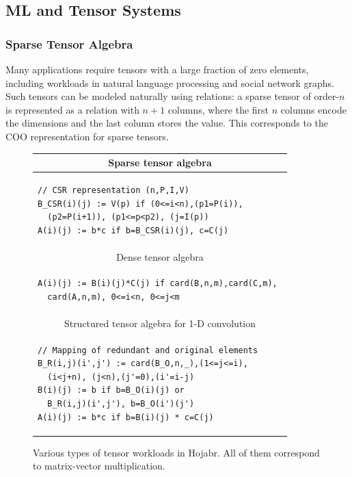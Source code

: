 \documentclass[sigconf,nonacm]{acmart}
\begin{document}
\subsection{ML and Tensor Systems}
\subsubsection{Sparse Tensor Algebra}
Many applications require tensors with a large fraction of zero elements, including workloads in natural language processing and social network graphs. Such tensors can be modeled naturally using relations: a sparse tensor of order-$n$ is represented as a relation with $n+1$ columns, where the first $n$ columns encode the dimensions and the last column stores the value. This corresponds to the COO representation for sparse tensors.


\begin{figure}[t!]
\begin{tabular}{|l|}
\hline 
\multicolumn{1}{|c|}{Sparse tensor algebra} \\ \hline \hline
\begin{lstlisting}
// CSR representation (n,P,I,V)
B_CSR(i)(j) := V(p) if (0<=i<n),(p1=P(i)),
  (p2=P(i+1)), (p1<=p<p2), (j=I(p))
A(i)(j) := b*c if b=B_CSR(i)(j), c=C(j)
\end{lstlisting} \\ \hline \hline \hline
\multicolumn{1}{|c|}{Dense tensor algebra} \\ \hline \hline
\begin{lstlisting}
A(i)(j) := B(i)(j)*C(j) if card(B,n,m),card(C,m), 
  card(A,n,m), 0<=i<n, 0<=j<m
\end{lstlisting} \\ \hline \hline \hline
\multicolumn{1}{|c|}{Structured tensor algebra for 1-D convolution} \\ \hline \hline
\begin{lstlisting}
// Mapping of redundant and original elements 
B_R(i,j)(i',j') := card(B_O,n,_),(1<=j<=i), 
  (i<j+n), (j<n),(j'=0),(i'=i-j)
B(i)(j) := b if b=B_O(i)(j) or 
  B_R(i,j)(i',j'), b=B_O(i')(j')
A(i)(j) := b*c if b=B(i)(j) * c=C(j)
\end{lstlisting}
\\ \hline
\end{tabular}
\caption{Various types of tensor workloads in Hojabr. All of them correspond to matrix-vector multiplication.}
\label{fig:tensor}
\end{figure}
\end{document}
